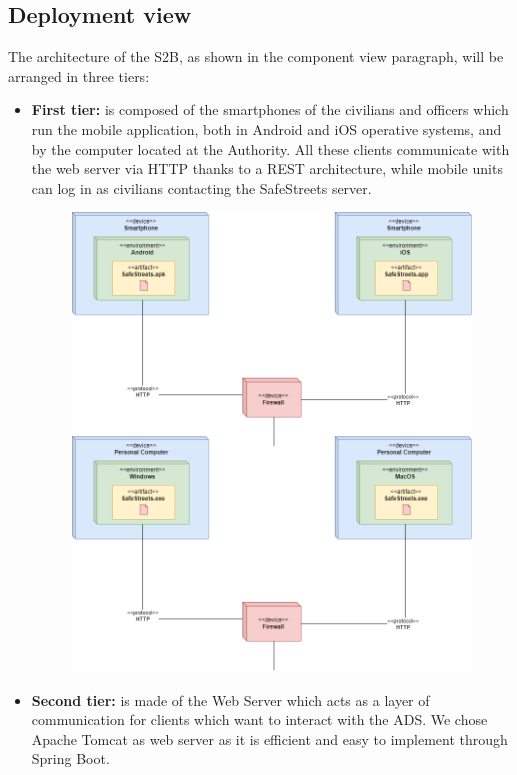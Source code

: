 \documentclass[12pt,a4paper]{article}
\begin{document}
\subsection{Deployment view}
The architecture of the S2B, as shown in the component view paragraph, will be arranged in three tiers:
\begin{itemize}
\item \textbf{First tier:} is composed of the smartphones of the civilians and officers which run the mobile application, both in Android and iOS operative systems, and by the computer located at the Authority. All these clients communicate with the web server via HTTP thanks to a REST architecture, while mobile units can log in as civilians contacting the SafeStreets server.
\begin{figure}[H]
				\centering
					        \includegraphics[width=0.6\paperwidth]{Images/firstTier}
			\end{figure}
\newpage
\item \textbf{Second tier:} is made of the Web Server which acts as a layer of communication for clients which want to interact with the ADS. We chose Apache Tomcat as web server as it is efficient and easy to implement through Spring Boot.

\end{itemize}
\end{document}
